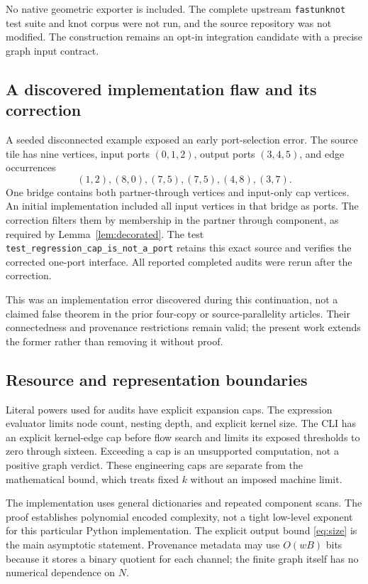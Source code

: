 \documentclass[11pt]{article}
\theoremstyle{remark}\newtheorem{remark}[theorem]{Remark}
\DeclareRobustCommand{\code}[1]{\nolinkurl{#1}}
\begin{document}
No native geometric exporter is included. The complete upstream \code{fastunknot} test suite and knot corpus were not run, and the source repository was not modified. The construction remains an opt-in integration candidate with a precise graph input contract.

\subsection{A discovered implementation flaw and its correction}
A seeded disconnected example exposed an early port-selection error. The source tile has nine vertices, input ports $(0,1,2)$, output ports $(3,4,5)$, and edge occurrences
\[
 (1,2),(8,0),(7,5),(7,5),(4,8),(3,7).
\]
One bridge contains both partner-through vertices and input-only cap vertices. An initial implementation included all input vertices in that bridge as ports. The correction filters them by membership in the partner through component, as required by Lemma~\ref{lem:decorated}. The test \code{test_regression_cap_is_not_a_port} retains this exact source and verifies the corrected one-port interface. All reported completed audits were rerun after the correction.

This was an implementation error discovered during this continuation, not a claimed false theorem in the prior four-copy or source-parallelity articles. Their connectedness and provenance restrictions remain valid; the present work extends the former rather than removing it without proof.

\subsection{Resource and representation boundaries}
Literal powers used for audits have explicit expansion caps. The expression evaluator limits node count, nesting depth, and explicit kernel size. The CLI has an explicit kernel-edge cap before flow search and limits its exposed thresholds to zero through sixteen. Exceeding a cap is an unsupported computation, not a positive graph verdict. These engineering caps are separate from the mathematical bound, which treats fixed $k$ without an imposed machine limit.

The implementation uses general dictionaries and repeated component scans. The proof establishes polynomial encoded complexity, not a tight low-level exponent for this particular Python implementation. The explicit output bound \eqref{eq:size} is the main asymptotic statement. Provenance metadata may use $O(wB)$ bits because it stores a binary quotient for each channel; the finite graph itself has no numerical dependence on $N$.
\end{document}
